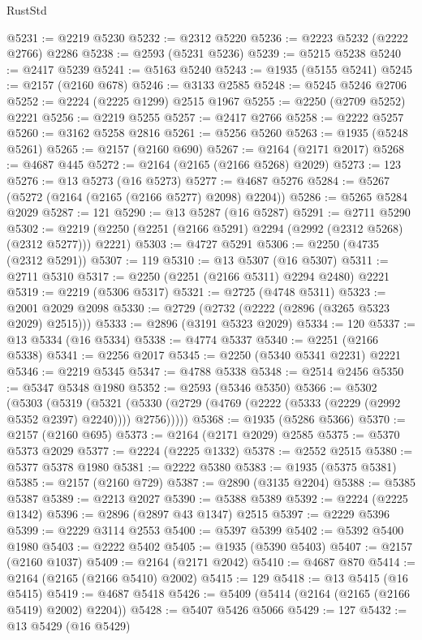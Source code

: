 \begin{lexlean}{RustStd}
\begin{coremodule}
{\begin{coremodule}
{{{{{{{{{{{{{{{{{{{{{{{{{{{{{{{{{{{{{{{{{{{{{{{{{{{{{@5231 := @2219 @5230
@5232 := @2312 @5220
@5236 := @2223 @5232 (@2222 @2766) @2286
@5238 := @2593 (@5231 @5236)
@5239 := @5215 @5238
@5240 := @2417 @5239
@5241 := @5163 @5240
@5243 := @1935 (@5155 @5241)
@5245 := @2157 (@2160 @678)
@5246 := @3133 @2585
@5248 := @5245 @5246 @2706
@5252 := @2224 (@2225 @1299) @2515 @1967
@5255 := @2250 (@2709 @5252) @2221
@5256 := @2219 @5255
@5257 := @2417 @2766
@5258 := @2222 @5257
@5260 := @3162 @5258 @2816
@5261 := @5256 @5260
@5263 := @1935 (@5248 @5261)
@5265 := @2157 (@2160 @690)
@5267 := @2164 (@2171 @2017)
@5268 := @4687 @445
@5272 := @2164 (@2165 (@2166 @5268) @2029)
@5273 := 123
@5276 := @13 @5273 (@16 @5273)
@5277 := @4687 @5276
@5284 := @5267 (@5272 (@2164 (@2165 (@2166 @5277) @2098) @2204))
@5286 := @5265 @5284 @2029
@5287 := 121
@5290 := @13 @5287 (@16 @5287)
@5291 := @2711 @5290
@5302 := @2219 (@2250 (@2251 (@2166 @5291) @2294 (@2992 (@2312 @5268) (@2312 @5277))) @2221)
@5303 := @4727 @5291
@5306 := @2250 (@4735 (@2312 @5291))
@5307 := 119
@5310 := @13 @5307 (@16 @5307)
@5311 := @2711 @5310
@5317 := @2250 (@2251 (@2166 @5311) @2294 @2480) @2221
@5319 := @2219 (@5306 @5317)
@5321 := @2725 (@4748 @5311)
@5323 := @2001 @2029 @2098
@5330 := @2729 (@2732 (@2222 (@2896 (@3265 @5323 @2029) @2515)))
@5333 := @2896 (@3191 @5323 @2029)
@5334 := 120
@5337 := @13 @5334 (@16 @5334)
@5338 := @4774 @5337
@5340 := @2251 (@2166 @5338)
@5341 := @2256 @2017
@5345 := @2250 (@5340 @5341 @2231) @2221
@5346 := @2219 @5345
@5347 := @4788 @5338
@5348 := @2514 @2456
@5350 := @5347 @5348 @1980
@5352 := @2593 (@5346 @5350)
@5366 := @5302
    (@5303
      (@5319
        (@5321 (@5330 (@2729 (@4769 (@2222 (@5333 (@2229 (@2992 @5352 @2397) @2240)))) @2756)))))
@5368 := @1935 (@5286 @5366)
@5370 := @2157 (@2160 @695)
@5373 := @2164 (@2171 @2029) @2585
@5375 := @5370 @5373 @2029
@5377 := @2224 (@2225 @1332)
@5378 := @2552 @2515
@5380 := @5377 @5378 @1980
@5381 := @2222 @5380
@5383 := @1935 (@5375 @5381)
@5385 := @2157 (@2160 @729)
@5387 := @2890 (@3135 @2204)
@5388 := @5385 @5387
@5389 := @2213 @2027
@5390 := @5388 @5389
@5392 := @2224 (@2225 @1342)
@5396 := @2896 (@2897 @43 @1347) @2515
@5397 := @2229 @5396
@5399 := @2229 @3114 @2553
@5400 := @5397 @5399
@5402 := @5392 @5400 @1980
@5403 := @2222 @5402
@5405 := @1935 (@5390 @5403)
@5407 := @2157 (@2160 @1037)
@5409 := @2164 (@2171 @2042)
@5410 := @4687 @870
@5414 := @2164 (@2165 (@2166 @5410) @2002)
@5415 := 129
@5418 := @13 @5415 (@16 @5415)
@5419 := @4687 @5418
@5426 := @5409 (@5414 (@2164 (@2165 (@2166 @5419) @2002) @2204))
@5428 := @5407 @5426 @5066
@5429 := 127
@5432 := @13 @5429 (@16 @5429)
}}}}}}}}}}}}}}}}}}}}}}}}}}}}}}}}}}}}}}}}}}}}}}}}}}}}}
\end{coremodule}}
\end{coremodule}
\end{lexlean}
